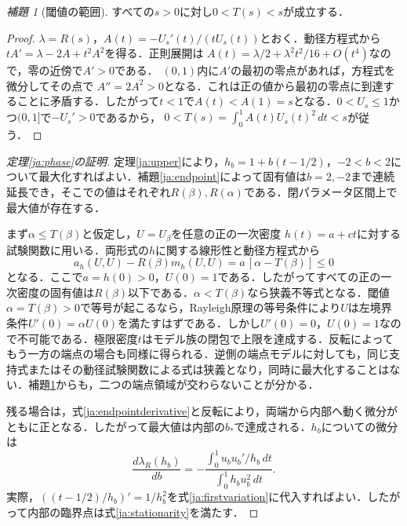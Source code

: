 \documentclass[12pt]{amsart}
\theoremstyle{definition}
\theoremstyle{remark}
\numberwithin{equation}{section}
\newtheorem{jlem}[thm]{補題}
\begin{document}
\begin{jlem}[閾値の範囲]\label{ja:thresholdrange}
すべての$s>0$に対し$0<T(s)<s$が成立する．
\end{jlem}
\begin{proof}
$\lambda=R(s)$，$A(t)=-U_s'(t)/(tU_s(t))$とおく．動径方程式から
$tA'=\lambda-2A+t^2A^2$を得る．正則展開は
$A(t)=\lambda/2+\lambda^2t^2/16+O(t^4)$なので，零の近傍で$A'>0$である．
$(0,1)$内に$A'$の最初の零点があれば，方程式を微分してその点で
$A''=2A^2>0$となる．これは正の値から最初の零点に到達することに矛盾する．したがって$t<1$で$A(t)<A(1)=s$となる．$0<U_s\le1$かつ$(0,1]$で$-U_s'>0$であるから，
$0<T(s)=\int_0^1A(t)U_s(t)^2\,dt<s$が従う．
\end{proof}

\begin{proof}[定理\ref{ja:phase}の証明]
定理\ref{ja:upper}により，$h_b=1+b(t-1/2)$，$-2<b<2$について最大化すればよい．補題\ref{ja:endpoint}によって固有値は$b=2,-2$まで連続延長でき，そこでの値はそれぞれ$R(\beta),R(\alpha)$である．閉パラメータ区間上で最大値が存在する．

まず$\alpha\le T(\beta)$と仮定し，$U=U_\beta$を任意の正の一次密度
$h(t)=a+ct$に対する試験関数に用いる．両形式の$h$に関する線形性と動径方程式から
\begin{equation}\label{ja:support}
 a_h(U,U)-R(\beta)m_h(U,U)=a\,[\alpha-T(\beta)]\le0
\end{equation}
となる．ここで$a=h(0)>0$，$U(0)=1$である．したがってすべての正の一次密度の固有値は$R(\beta)$以下である．$\alpha<T(\beta)$なら狭義不等式となる．閾値$\alpha=T(\beta)>0$で等号が起こるなら，Rayleigh原理の等号条件により$U$は左境界条件$U'(0)=\alpha U(0)$を満たすはずである．しかし$U'(0)=0$，$U(0)=1$なので不可能である．極限密度$t$はモデル族の閉包で上限を達成する．反転によってもう一方の端点の場合も同様に得られる．逆側の端点モデルに対しても，同じ支持式またはその動径試験関数による式は狭義となり，同時に最大化することはない．補題\ref{ja:thresholdrange}からも，二つの端点領域が交わらないことが分かる．

残る場合は，式\eqref{ja:endpointderivative}と反転により，両端から内部へ動く微分がともに正となる．したがって最大値は内部の$b_*$で達成される．$h_b$についての微分は
\begin{equation}\label{ja:affinevariation}
 \frac{d\lambda_R(h_b)}{db}
 =-\frac{\int_0^1u_bu_b'/h_b\,dt}{\int_0^1h_bu_b^2\,dt}.
\end{equation}
実際，$((t-1/2)/h_b)'=1/h_b^2$を式\eqref{ja:firstvariation}に代入すればよい．したがって内部の臨界点は式\eqref{ja:stationarity}を満たす．


\end{proof}
\end{document}
